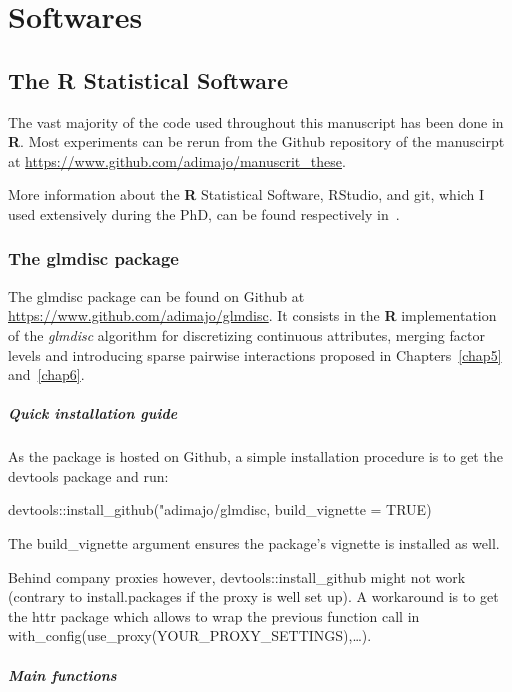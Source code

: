 \chapter{Softwares}

\section{The R Statistical Software}

The vast majority of the code used throughout this manuscript has been done in \textbf{R}. Most experiments can be rerun from the Github repository of the manuscirpt at \url{https://www.github.com/adimajo/manuscrit_these}.

More information about the \textbf{R} Statistical Software, RStudio, and git, which I used extensively during the PhD, can be found respectively in~\cite{}.

\subsection{The glmdisc package} \label{app2:glmdisc}

The glmdisc package can be found on Github at \url{https://www.github.com/adimajo/glmdisc}. It consists in the \textbf{R} implementation of the \textit{glmdisc} algorithm for discretizing continuous attributes, merging factor levels and introducing sparse pairwise interactions proposed in Chapters~\ref{chap5} and~\ref{chap6}.

\paragraph{Quick installation guide}

As the package is hosted on Github, a simple installation procedure is to get the devtools package and run:

devtools::install\_github("adimajo/glmdisc, build\_vignette = TRUE)

The build\_vignette argument ensures the package's vignette is installed as well.

Behind company proxies however, devtools::install\_github might not work (contrary to install.packages if the proxy is well set up). A workaround is to get the httr package which allows to wrap the previous function call in with\_config(use\_proxy(YOUR\_PROXY\_SETTINGS),\dots).

\paragraph{Main functions}

